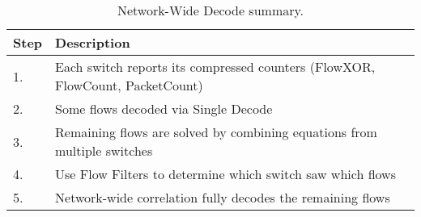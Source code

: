\highspace
\begin{table}[!htp]
    \centering
    \begin{adjustbox}{width={\textwidth},totalheight={\textheight},keepaspectratio}
        \begin{tabular}{@{} l | l @{}}
            \toprule
            \textbf{Step} & \textbf{Description} \\
            \midrule
            1. & Each switch reports its compressed counters (FlowXOR, FlowCount, PacketCount) \\ [.3em]
            2. & Some flows decoded via Single Decode \\ [.3em]
            3. & Remaining flows are solved by combining equations from multiple switches \\ [.3em]
            4. & Use Flow Filters to determine which switch saw which flows \\ [.3em]
            5. & Network-wide correlation fully decodes the remaining flows \\
            \bottomrule
        \end{tabular}
    \end{adjustbox}
    \caption{Network-Wide Decode summary.}
\end{table}

